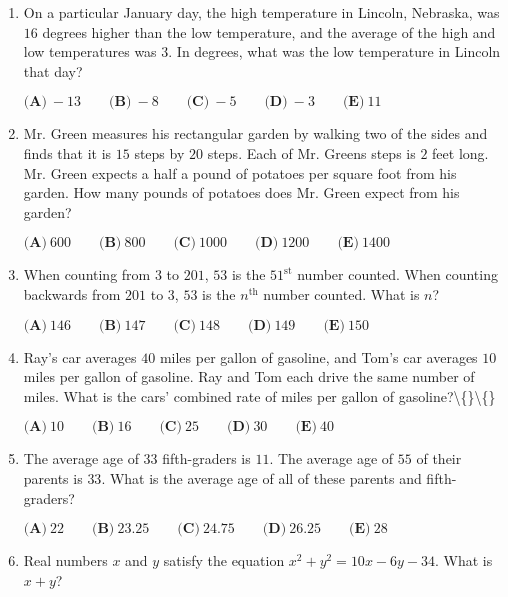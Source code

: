 \documentclass{article}
\begin{document}
\begin{enumerate}[label=\arabic*., itemsep=0.5em]
\item On a particular January day, the high temperature in Lincoln, Nebraska, was \(16\) degrees higher than the low temperature, and the average of the high and low temperatures was \(3\). In degrees, what was the low temperature in Lincoln that day?

\(\textbf{(A)}\ -13 \qquad \textbf{(B)}\ -8 \qquad \textbf{(C)}\ -5 \qquad \textbf{(D)}\ -3 \qquad \textbf{(E)}\ 11\)\par \vspace{0.5em}\item Mr. Green measures his rectangular garden by walking two of the sides and finds that it is \(15\) steps by \(20\) steps. Each of Mr. Greens steps is \(2\) feet long. Mr. Green expects a half a pound of potatoes per square foot from his garden. How many pounds of potatoes does Mr. Green expect from his garden?

\(\textbf{(A)}\ 600 \qquad \textbf{(B)}\ 800 \qquad \textbf{(C)}\ 1000 \qquad \textbf{(D)}\ 1200 \qquad \textbf{(E)}\ 1400\)\par \vspace{0.5em}\item When counting from \(3\) to \(201\), \(53\) is the \(51^{\text{st}}\) number counted. When counting backwards from \(201\) to \(3\), \(53\) is the \(n^{\text{th}}\) number counted. What is \(n\)?

\(\textbf{(A)}\ 146 \qquad \textbf{(B)}\ 147 \qquad \textbf{(C)}\ 148 \qquad \textbf{(D)}\ 149 \qquad \textbf{(E)}\ 150\)\par \vspace{0.5em}\item Ray's car averages \(40\) miles per gallon of gasoline, and Tom's car averages \(10\) miles per gallon of gasoline. Ray and Tom each drive the same number of miles. What is the cars' combined rate of miles per gallon of gasoline?\textbackslash\{\}\textbackslash\{\}


\(\textbf{(A)}\ 10 \qquad \textbf{(B)}\ 16 \qquad \textbf{(C)}\ 25 \qquad \textbf{(D)}\ 30 \qquad \textbf{(E)}\ 40\)\par \vspace{0.5em}\item The average age of \(33\) fifth-graders is \(11\). The average age of \(55\) of their parents is \(33\). What is the average age of all of these parents and fifth-graders?

\(\textbf{(A)}\ 22 \qquad \textbf{(B)}\ 23.25 \qquad \textbf{(C)}\ 24.75 \qquad \textbf{(D)}\ 26.25 \qquad \textbf{(E)}\ 28\)\par \vspace{0.5em}\item Real numbers \(x\) and \(y\) satisfy the equation \(x^2 + y^2 = 10x - 6y - 34\). What is \(x + y\)?


\end{enumerate}
\end{document}
